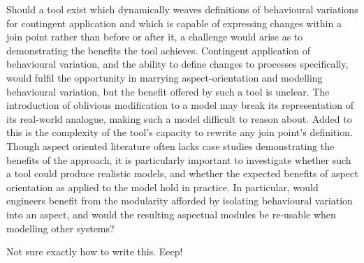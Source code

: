 Should a tool exist which dynamically weaves definitions of behavioural
variations for contingent application and which is capable of expressing changes
within a join point rather than before or after it, a challenge would arise as
to demonstrating the benefits the tool achieves. Contingent application of
behavioural variation, and the ability to define changes to processes
specifically, would fulfil the opportunity in marrying aspect-orientation and
modelling behavioural variation, but the benefit offered by such a tool is
unclear. The introduction of oblivious modification to a model may break its
representation of its real-world analogue, making such a model difficult to
reason about. Added to this is the complexity of the tool's capacity to rewrite
any join point's definition. Though aspect oriented literature often lacks case
studies demonstrating the benefits of the approach, it is particularly important
to investigate whether such a tool could produce realistic models, and whether
the expected benefits of aspect orientation as applied to the model hold in
practice. In particular, would engineers benefit from the modularity afforded
by isolating behavioural variation into an aspect, and would the resulting
aspectual modules be re-usable when modelling other systems?


Not sure exactly how to write this. Eeep!


